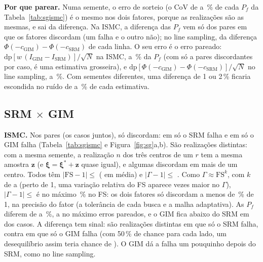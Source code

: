 \documentclass[11pt,a4paper]{article}
\newcommand{\xib}{\bm\xi}
\begin{document}
\textbf{Por que parear.} Numa semente, o erro de sorteio (o CoV de \sgCovMin{} a \sgCovMax\,\% de cada $P_f$ da
Tabela~\ref{tab:sgismc}) é o mesmo nos dois fatores, porque as realizações são as mesmas, e sai da diferença. Na ISMC,
a diferença das $P_f$ vem só dos pares em que os fatores discordam (um falha e o outro não); no line sampling, da
diferença $\Phi(-c_\text{GIM}) - \Phi(-c_\text{SRM})$ de cada linha. O seu erro é o erro pareado:
$\mathrm{dp}[w\,(I_\text{GIM} - I_\text{SRM})]/\sqrt N$ na ISMC, \sgEdifMin{} a \sgEdifMax\,\% da $P_f$ (com só
\sgDiscCasoMin{} a \sgDiscCasoMax{} pares discordantes por caso, é uma estimativa grosseira), e
$\mathrm{dp}[\Phi(-c_\text{GIM}) - \Phi(-c_\text{SRM})]/\sqrt N$ no line sampling, \sglEdifMin{} a
\sglEdifMax\,\%. Com sementes diferentes, uma diferença de 1 ou 2\,\% ficaria escondida no ruído de \sglCovMin{} a
\sgCovMax\,\% de cada estimativa.

\subsection{SRM \texorpdfstring{$\times$}{x} GIM}\label{sec:srmgim}
\textbf{ISMC.} Nos \sgPares{} pares (os \sgCasos{} casos juntos), só \sgDisc{} discordam: em \sgDiscSrm{} só o SRM falha
e em \sgDiscGim{} só o GIM falha (Tabela~\ref{tab:sgismc} e Figura~\ref{fig:sg}a,b). São \sgDiscDist{} realizações
distintas: com a mesma semente, a realização $n$ dos três centros de um $r$ tem a mesma amostra $\bm z$ (e
$\xib = \xib^* + \bm z$ quase igual), e algumas discordam em mais de um centro. Todos têm $|\mathrm{FS} - 1| \le$
\sgDiscFS{} (\sgDiscFSmed{} em média) e $|\Gamma - 1| \le$ \sgDiscG. Como $\Gamma \approx \mathrm{FS}^k$, com $k$ de
\sgKmin{} a \sgKmax{} (perto de 1, uma variação relativa do FS aparece \sgKperto{} vezes maior no $\Gamma$),
$|\Gamma - 1| \le$ \sgDiscG{} é no máximo \sgDiscGfs\,\% no FS: os dois fatores só discordam a menos de \sgDiscGfs\,\%
de 1, na precisão do fator (a tolerância de cada busca e a malha adaptativa). As $P_f$ diferem de \sgDifMin{} a
\sgDifMax\,\%, a no máximo \sgZmax{} erros pareados, e o GIM fica abaixo do SRM em \sgAbaixo{} dos \sgCasos{} casos.
A diferença tem sinal: são \sgDistSrm{} realizações distintas em que só o SRM falha, contra \sgDistGim{} em que só o
GIM falha (com 50\,\% de chance para cada lado, um desequilíbrio assim teria chance de \sgDistP). O GIM dá a falha um
pouquinho depois do SRM, como no line sampling.
\end{document}
